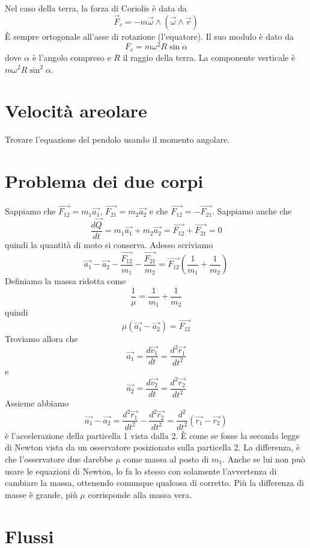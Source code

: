 \documentclass[a4paper]{article}
\begin{document}
Nel caso della terra, la forza di Coriolis è data da
\[
    \vec{F}_c = -m\vec{\omega} \wedge (\vec{\omega} \wedge \vec{r})
\]
È sempre ortogonale all'asse di rotazione (l'equatore).
Il suo modulo è dato da
\[
    F_c = m\omega^2 R \sin\alpha
\]
dove \(\alpha\) è l'angolo compreso e \(R\) il raggio della terra.
La componente verticale è \(m \omega^2 R \sin^2\alpha\).

\pagebreak

\section{Velocità areolare}

Trovare l'equazione del pendolo usando il momento angolare.

\section{Problema dei due corpi}

Sappiamo che \(\vec{F_{12}} = m_1\vec{a_1}\), \(\vec{F_{21}} = m_2\vec{a_2}\)
e che \(\vec{F_{12}} = -\vec{F_{21}}\).
Sappiamo anche che
\[
    \frac{d\vec{Q}}{dt} = m_1\vec{a_1} + m_2\vec{a_2} =\vec{F_{12}} + \vec{F_{21}} = 0
\]
quindi la quantità di moto si conserva.
Adesso scriviamo
\[
    \vec{a_1} - \vec{a_2} - \frac{\vec{F_{12}}}{m_1}
    - \frac{\vec{F_{21}}}{m_2} = \vec{F_{12}} \left(\frac{1}{m_1} + \frac{1}{m_2}\right)
\]
Definiamo la massa ridotta come
\[
    \frac{1}{\mu} = \frac{1}{m_1} + \frac{1}{m_2}
\]
quindi
\[
    \mu(\vec{a_1} - \vec{a_2}) = \vec{F_{12}}
\]
Troviamo allora che
\[
    \vec{a_1} = \frac{d\vec{v_1}}{dt} = \frac{d^2 \vec{r_1}}{dt^2}
\]
e
\[
    \vec{a_2} = \frac{d\vec{v_2}}{dt} = \frac{d^2 \vec{r_2}}{dt^2}
\]
Assieme abbiamo
\[
    \vec{a_1} - \vec{a_2} = \frac{d^2 \vec{r_1}}{dt^2} - \frac{d^2 \vec{r_2}}{dt^2}
    = \frac{d^2}{dt^2} \left(\vec{r_1} - \vec{r_2}\right)
\]
è l'accelerazione della particella 1 vista dalla 2.
È come se fosse la seconda legge di Newton vista da un osservatore posizionato sulla particella 2.
La differenza, è che l'osservatore due darebbe \(\mu\) come massa al posto di \(m_1\).
Anche se lui non può usare le equazioni di Newton, lo fa lo stesso con solamente l'avvertenza di cambiare
la massa, ottenendo comunque qualcosa di corretto.
Più la differenza di masse è grande, più \(\mu\) corrisponde alla massa vera.

\section{Flussi}
\end{document}
